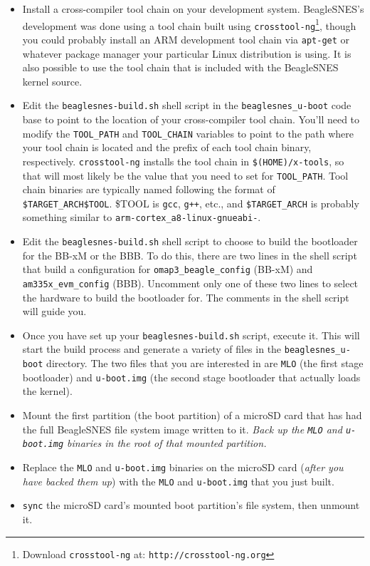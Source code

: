 \begin{itemize}
\item Install a cross-compiler tool chain on your development system.  BeagleSNES's development was done using a tool chain built using \texttt{crosstool-ng}\footnote{Download \texttt{crosstool-ng} at: \texttt{http://crosstool-ng.org}}, though you could probably install an ARM development tool chain via \texttt{apt-get} or whatever package manager your particular Linux distribution is using.  It is also possible to use the tool chain that is included with the BeagleSNES kernel source.
\item Edit the \texttt{beaglesnes-build.sh} shell script in the \texttt{beaglesnes\_u-boot} code base to point to the location of your cross-compiler tool chain.  You'll need to modify the \texttt{TOOL\_PATH} and \texttt{TOOL\_CHAIN} variables to point to the path where your tool chain is located and the prefix of each tool chain binary, respectively.  \texttt{crosstool-ng} installs the tool chain in \texttt{\$(HOME)/x-tools}, so that will most likely be the value that you need to set for \texttt{TOOL\_PATH}.  Tool chain binaries are typically named following the format of \texttt{\$TARGET\_ARCH\$TOOL}.  \$TOOL is \texttt{gcc}, \texttt{g++}, etc., and \texttt{\$TARGET\_ARCH} is probably something similar to \texttt{arm-cortex\_a8-linux-gnueabi-}.
\item Edit the \texttt{beaglesnes-build.sh} shell script to choose to build the bootloader for the BB-xM or the BBB.  To do this, there are two lines in the shell script that build a configuration for \texttt{omap3\_beagle\_config} (BB-xM) and \texttt{am335x\_evm\_config} (BBB).  Uncomment only one of these two lines to select the hardware to build the bootloader for.  The comments in the shell script will guide you.    
\item Once you have set up your \texttt{beaglesnes-build.sh} script, execute it.  This will start the build process and generate a variety of files in the \texttt{beaglesnes\_u-boot} directory.  The two files that you are interested in are \texttt{MLO} (the first stage bootloader) and \texttt{u-boot.img} (the second stage bootloader that actually loads the kernel).  
\item Mount the first partition (the boot partition) of a microSD card that has had the full BeagleSNES file system image written to it.  \emph{Back up the \texttt{MLO} and \texttt{u-boot.img} binaries in the root of that mounted partition.} 
\item Replace the \texttt{MLO} and \texttt{u-boot.img} binaries on the microSD card (\emph{after you have backed them up}) with the \texttt{MLO} and \texttt{u-boot.img} that you just built.
\item \texttt{sync} the microSD card's mounted boot partition's file system, then unmount it.    
\end{itemize}

